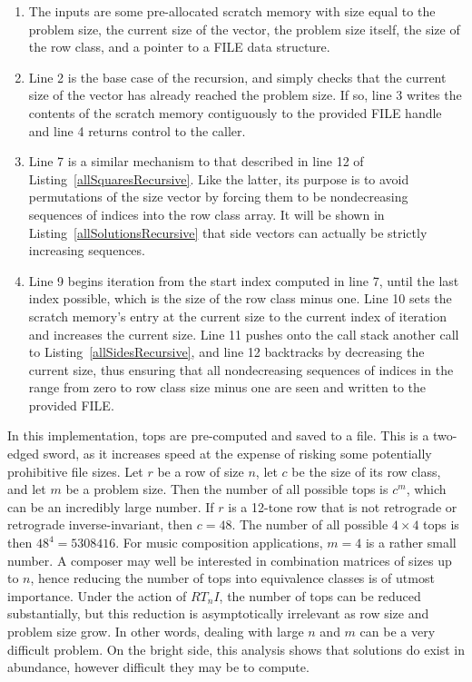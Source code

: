 \begin{enumerate}
\item The inputs are some pre-allocated scratch memory with size equal to the problem size, the current size of the vector, the problem size itself, the size of the row class, and a pointer to a FILE data structure.
\item Line 2 is the base case of the recursion, and simply checks that the current size of the vector has already reached the problem size. If so, line 3 writes the contents of the scratch memory contiguously to the provided FILE handle and line 4 returns control to the caller.
\addtocounter{enumi}{4}
\item Line 7 is a similar mechanism to that described in line 12 of Listing~\ref{allSquaresRecursive}. Like the latter, its purpose is to avoid permutations of the size vector by forcing them to be nondecreasing sequences of indices into the row class array. It will be shown in Listing~\ref{allSolutionsRecursive} that side vectors can actually be strictly increasing sequences.
\addtocounter{enumi}{1}
\item Line 9 begins iteration from the start index computed in line 7, until the last index possible, which is the size of the row class minus one. Line 10 sets the scratch memory's entry at the current size to the current index of iteration and increases the current size. Line 11 pushes onto the call stack another call to Listing~\ref{allSidesRecursive}, and line 12 backtracks by decreasing the current size, thus ensuring that all nondecreasing sequences of indices in the range from zero to row class size minus one are seen and written to the provided FILE.
\end{enumerate}

In this implementation, tops are pre-computed and saved to a file. This is a two-edged sword, as it increases speed at the expense of risking some potentially prohibitive file sizes. Let $r$ be a row of size $n$, let $c$ be the size of its row class, and let $m$ be a problem size. Then the number of all possible tops is $c^m$, which can be an incredibly large number. If $r$ is a 12-tone row that is not retrograde or retrograde inverse-invariant, then $c = 48$. The number of all possible $4 \times 4$ tops is then $48^4 = 5308416$. For music composition applications, $m = 4$ is a rather small number. A composer may well be interested in combination matrices of sizes up to $n$, hence reducing the number of tops into equivalence classes is of utmost importance. Under the action of $RT_nI$, the number of tops can be reduced substantially, but this reduction is asymptotically irrelevant as row size and problem size grow. In other words, dealing with large $n$ and $m$ can be a very difficult problem. On the bright side, this analysis shows that solutions do exist in abundance, however difficult they may be to compute.

